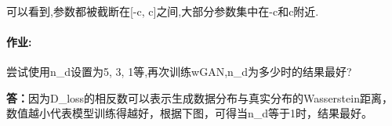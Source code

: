 \documentclass[11pt]{article}
\begin{document}
    \begin{center}
    \end{center}
    { \hspace*{\fill} \\}
    
    可以看到,参数都被截断在{[}-c, c{]}之间,大部分参数集中在-c和c附近.

    \hypertarget{ux4f5cux4e1a}{%
\paragraph{\texorpdfstring{\textbf{作业}:}{作业:}}\label{ux4f5cux4e1a}}

尝试使用n\_d设置为5, 3, 1等,再次训练wGAN,n\_d为多少时的结果最好?

    \textbf{答：}因为D\_loss的相反数可以表示生成数据分布与真实分布的Wasserstein距离，数值越小代表模型训练得越好，根据下图，可得当n\_d等于1时，结果最好。
\end{document}
